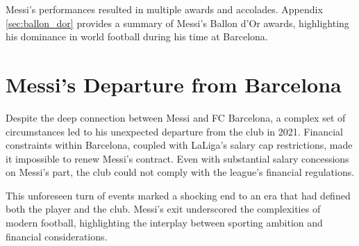 Messi's performances resulted in multiple awards and accolades.
Appendix \ref{sec:ballon_dor} provides a summary of Messi's Ballon 
d'Or awards, highlighting his dominance in world football during his time 
at Barcelona.

\section{Messi's Departure from Barcelona}\label{sec:messi_departure}

Despite the deep connection between Messi and FC Barcelona, a complex 
set of circumstances led to his unexpected departure from the club in 2021.
Financial constraints within Barcelona, coupled with LaLiga's salary cap 
restrictions, made it impossible to renew Messi's contract.
Even with substantial salary concessions on Messi's part, the club could 
not comply with the league's financial regulations. 

This unforeseen turn of events marked a shocking end to an era that had 
defined both the player and the club.
Messi's exit underscored the complexities of modern football, 
highlighting the interplay between sporting ambition and financial 
considerations.
